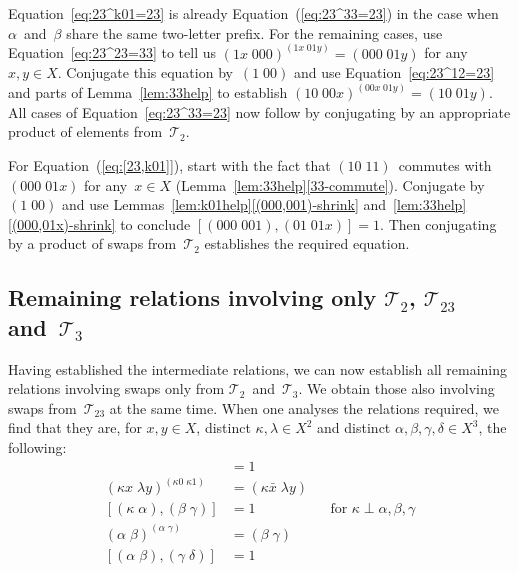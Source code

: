 \documentclass[a4paper,11pt]{article}
\numberwithin{equation}{section}
\newcommand{\eqstate}[1]{Equation~(\ref{#1})}
\newcommand{\swap}[2]{(#1\;#2)}
\newcommand{\Sw}[1]{\mathcal{T}_{#1}}
\begin{document}
Equation~\eqref{eq:23^k01=23} is already \eqstate{eq:23^33=23} in the
case when $\alpha$~and~$\beta$ share the same two-letter prefix.  For
the remaining cases, use Equation~\eqref{eq:23^23=33} to tell us
$\swap{1x}{000}^{\swap{1x}{01y}} = \swap{000}{01y}$ for any $x,y \in
X$.  Conjugate this equation by~$\swap{1}{00}$ and use
Equation~\eqref{eq:23^12=23} and parts of Lemma~\ref{lem:33help} to
establish $\swap{10}{00x}^{\swap{00x}{01y}} = \swap{10}{01y}$.  All
cases of Equation~\ref{eq:23^33=23} now follow by conjugating by an
appropriate product of elements from~$\Sw{2}$.

For \eqstate{eq:[23,k01]}, start with the fact that
$\swap{10}{11}$~commutes with $\swap{000}{01x}$ for any~$x \in X$
(Lemma~\ref{lem:33help}\ref{33-commute}).  Conjugate by~$\swap{1}{00}$
and use Lemmas~\ref{lem:k01help}\ref{(000,001)-shrink}
and~\ref{lem:33help}\ref{(000,01x)-shrink} to conclude $[
  \swap{000}{001} , \swap{01}{01x} ] = 1$.  Then conjugating by a
product of swaps from~$\Sw{2}$ establishes the required equation.

\subsection{\boldmath Remaining relations involving only $\Sw{2}$,
  $\Sw{23}$ and~$\Sw{3}$}

Having established the intermediate relations, we can now establish
all remaining relations involving swaps only from
$\Sw{2}$~and~$\Sw{3}$.  We obtain those also involving swaps
from~$\Sw{23}$ at the same time.  When one analyses the relations
required, we find that they are, for $x,y \in X$, distinct
$\kappa,\lambda \in X^{2}$ and distinct $\alpha,\beta,\gamma,\delta
\in X^{3}$, the following:
\begin{align}
  [ \swap{\kappa0}{\kappa1} , \swap{\lambda x}{\mu y} ] &= 1
  \label{eq:[k01,33]}  
  \\
  \swap{\kappa x}{\lambda y}^{\swap{\kappa0}{\kappa1}} &=
  \swap{\kappa\bar{x}}{\lambda y}
  \label{eq:33^k01}
  \\
  [ \swap{\kappa}{\alpha} , \swap{\beta}{\gamma} ] &= 1
  &&\text{for $\kappa \perp \alpha,\beta,\gamma$}
  \label{eq:[23,33]}
  \\
  \swap{\alpha}{\beta}^{\swap{\alpha}{\gamma}} &= \swap{\beta}{\gamma}
  \label{eq:33^33}
  \\
  [ \swap{\alpha}{\beta} , \swap{\gamma}{\delta} ] &= 1
  \label{eq:[33,33]}
\end{align}
\end{document}
